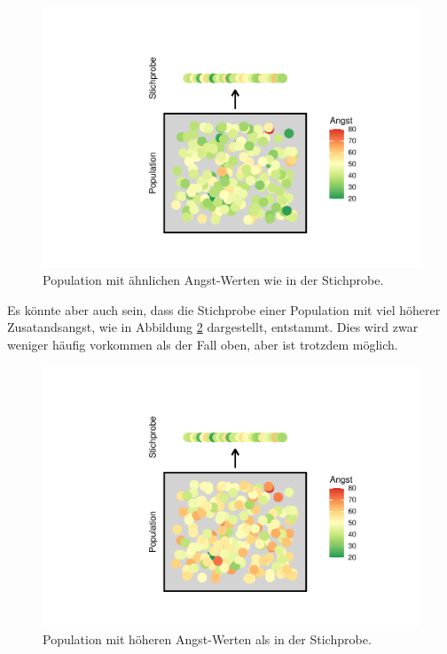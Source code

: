 \documentclass[
]{book}
\theoremstyle{definition}
\theoremstyle{definition}
\theoremstyle{definition}
\theoremstyle{definition}
\theoremstyle{remark}
\begin{document}
\begin{figure}
\centering
\includegraphics{aps_statistik1_files/figure-latex/srs-intervall-high-p-1.pdf}
\caption{\label{fig:srs-intervall-high-p}Population mit ähnlichen Angst-Werten wie in der Stichprobe.}
\end{figure}

Es könnte aber auch sein, dass die Stichprobe einer Population mit viel höherer Zusatandsangst, wie in Abbildung \ref{fig:srs-intervall-low-p} dargestellt, entstammt. Dies wird zwar weniger häufig vorkommen als der Fall oben, aber ist trotzdem möglich.

\begin{figure}
\centering
\includegraphics{aps_statistik1_files/figure-latex/srs-intervall-low-p-1.pdf}
\caption{\label{fig:srs-intervall-low-p}Population mit höheren Angst-Werten als in der Stichprobe.}
\end{figure}
\end{document}

